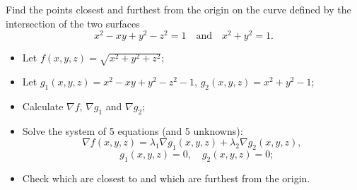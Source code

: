 \begin{example}
    Find the points closest and furthest from the origin on the curve defined by the intersection of the two surfaces
    \[
        x^2 - xy + y^2 - z^2 = 1
        \quad \text{and} \quad
        x^2 + y^2 = 1.
    \]
    \vspace{-1em}
    \begin{itemize}
        \item Let \(f(x,y,z) = \sqrt{x^2 + y^2 + z^2}\);
        \item Let \(g_1(x,y,z) = x^2 - xy + y^2 - z^2 - 1\),
              \(g_2(x,y,z) = x^2 + y^2 - 1\);
        \item Calculate \(\nabla f\), \(\nabla g_1\) and \(\nabla g_2\);
        \item Solve the system of 5 equations (and 5 unknowns):
              \vspace{-1em}
              \[
                  \nabla f (x,y,z) = \lambda_1 \nabla g_1(x,y,z)  + \lambda_2 \nabla g_2(x,y,z),
              \]
              \[
                  \quad g_1(x,y,z) =0,
                  \quad g_2(x,y,z) =0;
              \]
        \item Check which are closest to and which are furthest from the origin.
    \end{itemize}
\end{example}



